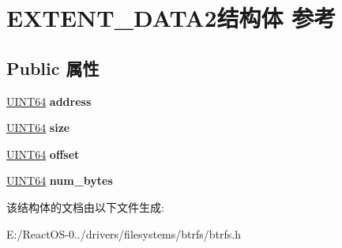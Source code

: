 \hypertarget{struct_e_x_t_e_n_t___d_a_t_a2}{}\section{E\+X\+T\+E\+N\+T\+\_\+\+D\+A\+T\+A2结构体 参考}
\label{struct_e_x_t_e_n_t___d_a_t_a2}
\subsection*{Public 属性}
\begin{DoxyCompactItemize}
\item 
\mbox{\label{struct_e_x_t_e_n_t___d_a_t_a2_a4827afa7c31529f85d5eacd8930c90cc}} 
\hyperlink{_processor_bind_8h_a57be03562867144161c1bfee95ca8f7c}{U\+I\+N\+T64} {\bfseries address}
\item 
\mbox{\label{struct_e_x_t_e_n_t___d_a_t_a2_ad1e4968123b72a3e7c99c72ffeec5b36}} 
\hyperlink{_processor_bind_8h_a57be03562867144161c1bfee95ca8f7c}{U\+I\+N\+T64} {\bfseries size}
\item 
\mbox{\label{struct_e_x_t_e_n_t___d_a_t_a2_aa40f32e3db3899d5575c0c4b2948359e}} 
\hyperlink{_processor_bind_8h_a57be03562867144161c1bfee95ca8f7c}{U\+I\+N\+T64} {\bfseries offset}
\item 
\mbox{\label{struct_e_x_t_e_n_t___d_a_t_a2_a16f5d037059bfcbfcf27b0c2e396f94b}} 
\hyperlink{_processor_bind_8h_a57be03562867144161c1bfee95ca8f7c}{U\+I\+N\+T64} {\bfseries num\+\_\+bytes}
\end{DoxyCompactItemize}


该结构体的文档由以下文件生成\+:\begin{DoxyCompactItemize}
\item 
E\+:/\+React\+O\+S-\/0../drivers/filesystems/btrfs/btrfs.\+h\end{DoxyCompactItemize}
